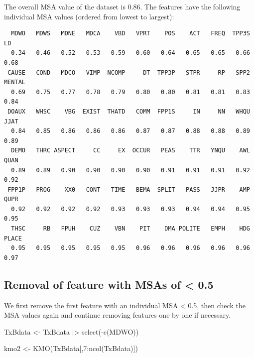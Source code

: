 \documentclass[
  letterpaper,
  DIV=11,
  numbers=noendperiod]{scrreprt}
\newenvironment{Shaded}{\begin{snugshade}}{\end{snugshade}}
\newcommand{\DecValTok}[1]{\textcolor[rgb]{0.68,0.00,0.00}{#1}}
\newcommand{\FunctionTok}[1]{\textcolor[rgb]{0.28,0.35,0.67}{#1}}
\newcommand{\NormalTok}[1]{\textcolor[rgb]{0.00,0.23,0.31}{#1}}
\newcommand{\OtherTok}[1]{\textcolor[rgb]{0.00,0.23,0.31}{#1}}
\newcommand{\SpecialCharTok}[1]{\textcolor[rgb]{0.37,0.37,0.37}{#1}}
\begin{document}
The overall MSA value of the dataset is 0.86. The features have the
following individual MSA values (ordered from lowest to largest):

\begin{Shaded}
\end{Shaded}

\begin{verbatim}
  MDWO   MDWS   MDNE   MDCA    VBD   VPRT    POS    ACT   FREQ  TPP3S     LD 
  0.34   0.46   0.52   0.53   0.59   0.60   0.64   0.65   0.65   0.66   0.68 
 CAUSE   COND   MDCO   VIMP  NCOMP     DT  TPP3P   STPR     RP   SPP2 MENTAL 
  0.69   0.75   0.77   0.78   0.79   0.80   0.80   0.81   0.81   0.83   0.84 
 DOAUX   WHSC    VBG  EXIST  THATD   COMM  FPP1S     IN     NN   WHQU   JJAT 
  0.84   0.85   0.86   0.86   0.86   0.87   0.87   0.88   0.88   0.89   0.89 
  DEMO   THRC ASPECT     CC     EX  OCCUR   PEAS    TTR   YNQU    AWL   QUAN 
  0.89   0.89   0.90   0.90   0.90   0.90   0.91   0.91   0.91   0.92   0.92 
 FPP1P   PROG    XX0   CONT   TIME   BEMA  SPLIT   PASS   JJPR    AMP   QUPR 
  0.92   0.92   0.92   0.92   0.93   0.93   0.93   0.94   0.94   0.95   0.95 
  THSC     RB   FPUH    CUZ    VBN    PIT    DMA POLITE   EMPH    HDG  PLACE 
  0.95   0.95   0.95   0.95   0.95   0.96   0.96   0.96   0.96   0.96   0.97 
\end{verbatim}

\subsection{Removal of feature with MSAs of \textless{}
0.5}\label{removal-of-feature-with-msas-of-0.5}

We first remove the first feature with an individual MSA \textless{}
0.5, then check the MSA values again and continue removing features one
by one if necessary.

\begin{Shaded}
\begin{Highlighting}[]
\NormalTok{TxBdata }\OtherTok{\textless{}{-}}\NormalTok{ TxBdata }\SpecialCharTok{|\textgreater{}} 
  \FunctionTok{select}\NormalTok{(}\SpecialCharTok{{-}}\FunctionTok{c}\NormalTok{(MDWO))}

\NormalTok{kmo2 }\OtherTok{\textless{}{-}} \FunctionTok{KMO}\NormalTok{(TxBdata[,}\DecValTok{7}\SpecialCharTok{:}\FunctionTok{ncol}\NormalTok{(TxBdata)]) }
\end{Highlighting}
\end{Shaded}
\end{document}

